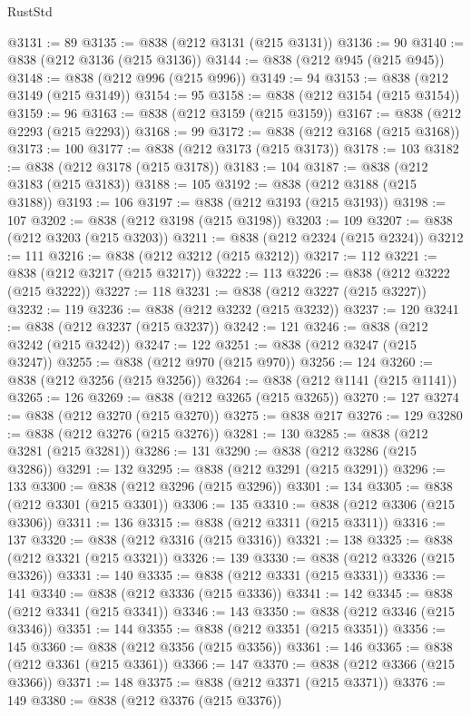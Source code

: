 \begin{lexlean}{RustStd}
\begin{coremodule}
@3131 := 89
@3135 := @838 (@212 @3131 (@215 @3131))
@3136 := 90
@3140 := @838 (@212 @3136 (@215 @3136))
@3144 := @838 (@212 @945 (@215 @945))
@3148 := @838 (@212 @996 (@215 @996))
@3149 := 94
@3153 := @838 (@212 @3149 (@215 @3149))
@3154 := 95
@3158 := @838 (@212 @3154 (@215 @3154))
@3159 := 96
@3163 := @838 (@212 @3159 (@215 @3159))
@3167 := @838 (@212 @2293 (@215 @2293))
@3168 := 99
@3172 := @838 (@212 @3168 (@215 @3168))
@3173 := 100
@3177 := @838 (@212 @3173 (@215 @3173))
@3178 := 103
@3182 := @838 (@212 @3178 (@215 @3178))
@3183 := 104
@3187 := @838 (@212 @3183 (@215 @3183))
@3188 := 105
@3192 := @838 (@212 @3188 (@215 @3188))
@3193 := 106
@3197 := @838 (@212 @3193 (@215 @3193))
@3198 := 107
@3202 := @838 (@212 @3198 (@215 @3198))
@3203 := 109
@3207 := @838 (@212 @3203 (@215 @3203))
@3211 := @838 (@212 @2324 (@215 @2324))
@3212 := 111
@3216 := @838 (@212 @3212 (@215 @3212))
@3217 := 112
@3221 := @838 (@212 @3217 (@215 @3217))
@3222 := 113
@3226 := @838 (@212 @3222 (@215 @3222))
@3227 := 118
@3231 := @838 (@212 @3227 (@215 @3227))
@3232 := 119
@3236 := @838 (@212 @3232 (@215 @3232))
@3237 := 120
@3241 := @838 (@212 @3237 (@215 @3237))
@3242 := 121
@3246 := @838 (@212 @3242 (@215 @3242))
@3247 := 122
@3251 := @838 (@212 @3247 (@215 @3247))
@3255 := @838 (@212 @970 (@215 @970))
@3256 := 124
@3260 := @838 (@212 @3256 (@215 @3256))
@3264 := @838 (@212 @1141 (@215 @1141))
@3265 := 126
@3269 := @838 (@212 @3265 (@215 @3265))
@3270 := 127
@3274 := @838 (@212 @3270 (@215 @3270))
@3275 := @838 @217
@3276 := 129
@3280 := @838 (@212 @3276 (@215 @3276))
@3281 := 130
@3285 := @838 (@212 @3281 (@215 @3281))
@3286 := 131
@3290 := @838 (@212 @3286 (@215 @3286))
@3291 := 132
@3295 := @838 (@212 @3291 (@215 @3291))
@3296 := 133
@3300 := @838 (@212 @3296 (@215 @3296))
@3301 := 134
@3305 := @838 (@212 @3301 (@215 @3301))
@3306 := 135
@3310 := @838 (@212 @3306 (@215 @3306))
@3311 := 136
@3315 := @838 (@212 @3311 (@215 @3311))
@3316 := 137
@3320 := @838 (@212 @3316 (@215 @3316))
@3321 := 138
@3325 := @838 (@212 @3321 (@215 @3321))
@3326 := 139
@3330 := @838 (@212 @3326 (@215 @3326))
@3331 := 140
@3335 := @838 (@212 @3331 (@215 @3331))
@3336 := 141
@3340 := @838 (@212 @3336 (@215 @3336))
@3341 := 142
@3345 := @838 (@212 @3341 (@215 @3341))
@3346 := 143
@3350 := @838 (@212 @3346 (@215 @3346))
@3351 := 144
@3355 := @838 (@212 @3351 (@215 @3351))
@3356 := 145
@3360 := @838 (@212 @3356 (@215 @3356))
@3361 := 146
@3365 := @838 (@212 @3361 (@215 @3361))
@3366 := 147
@3370 := @838 (@212 @3366 (@215 @3366))
@3371 := 148
@3375 := @838 (@212 @3371 (@215 @3371))
@3376 := 149
@3380 := @838 (@212 @3376 (@215 @3376))

\end{coremodule}
\end{lexlean}
